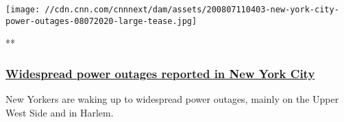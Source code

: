 \begin{itemize}
  \texttt{[image: //cdn.cnn.com/cnnnext/dam/assets/200807110403-new-york-city-power-outages-08072020-large-tease.jpg]}

  **

  \hypertarget{widespread-power-outages-reported-in-new-york-city}{%
  \subsubsection{\texorpdfstring{\href{/videos/us/2020/08/07/new-york-city-power-outages-es-ldn-vpx.cnn}{Widespread
  power outages reported in New York
  City}}{Widespread power outages reported in New York City}}\label{widespread-power-outages-reported-in-new-york-city}}

  New Yorkers are waking up to widespread power outages, mainly on the
  Upper West Side and in Harlem.
\end{itemize}

